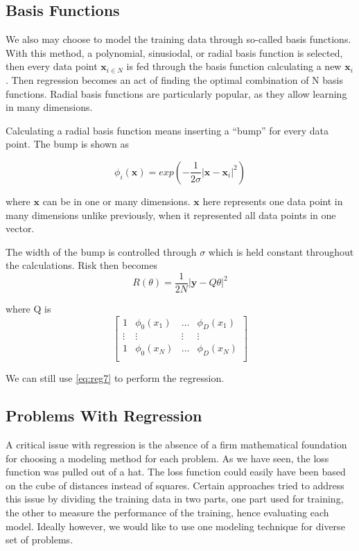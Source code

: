 \documentclass{ecctd01} %
\begin{document}
\subsection{Basis Functions}
We also may choose to model the training data through so-called basis
functions. With this method, a polynomial, sinusiodal, or radial basis
function is selected, then every data point $\mathbf{x}_{i\in N}$ is
fed through the basis function calculating a new $\mathbf{x}_{i}$. Then
regression becomes an act of finding the optimal combination of N
basis functions. Radial basis functions are particularly popular, as
they allow learning in many dimensions.  

Calculating a radial basis function means inserting a ``bump'' for
every data point. The bump is shown as

\begin{displaymath}
  \phi_{i}(\mathbf{x}) = exp\left(
  -\frac{1}{2\sigma}\left|\mathbf{x} - \mathbf{x}_{i}\right|^2
  \right)
\end{displaymath}

where $\mathbf{x}$ can be in one or many dimensions. $\mathbf{x}$ here
represents one data point in many dimensions unlike previously, when
it represented all data points in one vector.

The width of the bump is controlled through $\sigma$ which is held
constant throughout the calculations. Risk then becomes  
\begin{equation}
  \label{eq:reg10}
  R(\theta) = \frac{1}{2N}|\mathbf{y} - Q\theta|^2
\end{equation}

where Q is 
\begin{displaymath}
  \label{eq:reg9}
  \left[ \begin{array}{cccc}
      1 & \phi_{0}(x_{1}) & \hdots & \phi_{D}(x_{1}) \\
      \vdots & \vdots & \vdots & \vdots \\
      1 & \phi_{0}(x_{N}) & \hdots & \phi_{D}(x_{N}) \\
  \end{array} \right]
\end{displaymath}

We can still use \eqref{eq:reg7} to perform the regression. 

\subsection{Problems With Regression}
A critical issue with regression is the absence of a firm mathematical
foundation for choosing a modeling method for each
problem. As we have seen, the loss function was pulled out of a
hat. The loss function could easily have been based on the cube of 
distances instead of squares. Certain approaches tried to address this
issue by dividing the training data in two parts, one part used for
training, the other to measure the performance of the training, hence
evaluating each model. Ideally however, we would like to use one
modeling technique for diverse set of problems.
\end{document}
